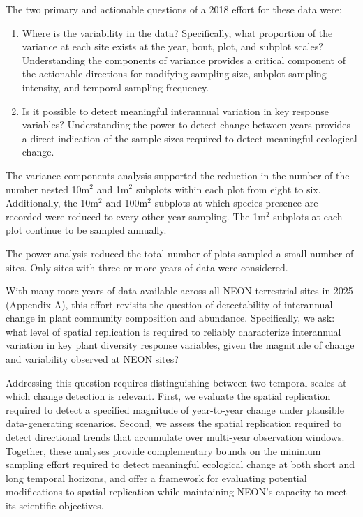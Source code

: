 \documentclass[
  11pt,
]{article}
\begin{document}
The two primary and actionable questions of a 2018 effort for these data
were:

\begin{enumerate}
   \item Where is the variability in the data? Specifically, what proportion of the variance at each site exists at the year, bout, plot, and subplot scales?  Understanding the components of variance provides a critical component of the actionable directions for modifying sampling size, subplot sampling intensity, and temporal sampling frequency. 
   
   \item Is it possible to detect meaningful interannual variation in key response variables? Understanding the power to detect change between years provides a direct indication of the sample sizes required to detect meaningful ecological change. 
\end{enumerate}

The variance components analysis supported the reduction in the number
of the number nested 10m\(^2\) and 1m\(^2\) subplots within each plot
from eight to six. Additionally, the 10m\(^2\) and 100m\(^2\) subplots
at which species presence are recorded were reduced to every other year
sampling. The 1m\(^2\) subplots at each plot continue to be sampled
annually.

The power analysis reduced the total number of plots sampled a small
number of sites. Only sites with three or more years of data were
considered.

With many more years of data available across all NEON terrestrial sites
in 2025 (Appendix A), this effort revisits the question of detectability
of interannual change in plant community composition and abundance.
Specifically, we ask: what level of spatial replication is required to
reliably characterize interannual variation in key plant diversity
response variables, given the magnitude of change and variability
observed at NEON sites?

Addressing this question requires distinguishing between two temporal
scales at which change detection is relevant. First, we evaluate the
spatial replication required to detect a specified magnitude of
year-to-year change under plausible data-generating scenarios. Second,
we assess the spatial replication required to detect directional trends
that accumulate over multi-year observation windows. Together, these
analyses provide complementary bounds on the minimum sampling effort
required to detect meaningful ecological change at both short and long
temporal horizons, and offer a framework for evaluating potential
modifications to spatial replication while maintaining NEON's capacity
to meet its scientific objectives.
\end{document}
